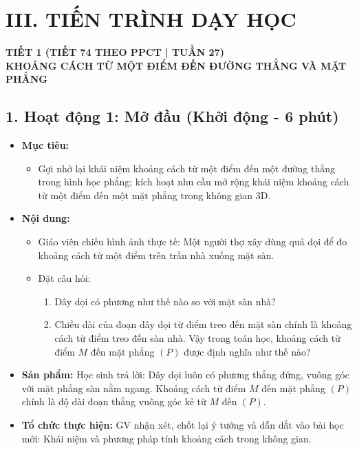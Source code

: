 \documentclass[12pt, a4paper]{article}
\begin{document}
\section*{III. TIẾN TRÌNH DẠY HỌC}

\begin{center}
    \textbf{\large TIẾT 1 (TIẾT 74 THEO PPCT | TUẦN 27)}\\[4pt]
    \textbf{\large KHOẢNG CÁCH TỪ MỘT ĐIỂM ĐẾN ĐƯỜNG THẲNG VÀ MẶT PHẲNG}
\end{center}

\subsection*{1. Hoạt động 1: Mở đầu (Khởi động - 6 phút)}

\begin{itemize}[leftmargin=1.2cm]
    \item[a)] \textbf{Mục tiêu:}
    \begin{itemize}[leftmargin=0.6cm]
        \item Gợi nhớ lại khái niệm khoảng cách từ một điểm đến một đường thẳng trong hình học phẳng; kích hoạt nhu cầu mở rộng khái niệm khoảng cách từ một điểm đến một mặt phẳng trong không gian 3D.
    \end{itemize}

    \item[b)] \textbf{Nội dung:}
    \begin{itemize}[leftmargin=0.6cm]
        \item Giáo viên chiếu hình ảnh thực tế: Một người thợ xây dùng quả dọi để đo khoảng cách từ một điểm trên trần nhà xuống mặt sàn.
        \item Đặt câu hỏi:
        \begin{enumerate}
            \item Dây dọi có phương như thế nào so với mặt sàn nhà?
            \item Chiều dài của đoạn dây dọi từ điểm treo đến mặt sàn chính là khoảng cách từ điểm treo đến sàn nhà. Vậy trong toán học, khoảng cách từ điểm $M$ đến mặt phẳng $(P)$ được định nghĩa như thế nào?
        \end{enumerate}
    \end{itemize}

    \item[c)] \textbf{Sản phẩm:} Học sinh trả lời: Dây dọi luôn có phương thẳng đứng, vuông góc với mặt phẳng sàn nằm ngang. Khoảng cách từ điểm $M$ đến mặt phẳng $(P)$ chính là độ dài đoạn thẳng vuông góc kẻ từ $M$ đến $(P)$.
    \item[d)] \textbf{Tổ chức thực hiện:} GV nhận xét, chốt lại ý tưởng và dẫn dắt vào bài học mới: Khái niệm và phương pháp tính khoảng cách trong không gian.
\end{itemize}
\end{document}
